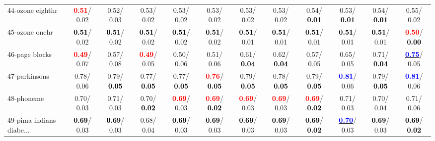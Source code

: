 \begin{table}[h]
\begin{center}
{\begin{tabular}{lc|c|c|c|c|c|c|c|c|c|c}
44-ozone eighthr & \textcolor{red}{\textbf{  0.51}}/  0.02 &   0.52/  0.03 &   0.53/  0.02 &   0.53/  0.02 &   0.53/  0.02 &   0.53/  0.02 &   0.53/  0.02 &   0.54/\textcolor{black}{\textbf{  0.01}} &   0.53/\textcolor{black}{\textbf{  0.01}} &   0.54/\textcolor{black}{\textbf{  0.01}} &   0.55/  0.02 \\
45-ozone onehr & \textcolor{black}{\textbf{  0.51}}/  0.02 & \textcolor{black}{\textbf{  0.51}}/  0.02 & \textcolor{black}{\textbf{  0.51}}/  0.02 & \textcolor{black}{\textbf{  0.51}}/  0.02 & \textcolor{black}{\textbf{  0.51}}/  0.02 & \textcolor{black}{\textbf{  0.51}}/  0.01 & \textcolor{black}{\textbf{  0.51}}/  0.01 & \textcolor{black}{\textbf{  0.51}}/  0.01 & \textcolor{black}{\textbf{  0.51}}/  0.01 & \textcolor{black}{\textbf{  0.51}}/  0.01 & \textcolor{red}{\textbf{  0.50}}/\textcolor{black}{\textbf{  0.00}} \\
46-page blocks & \textcolor{red}{\textbf{  0.49}}/  0.07 &   0.57/  0.08 & \textcolor{red}{\textbf{  0.49}}/  0.05 &   0.50/  0.06 &   0.51/  0.06 &   0.61/\textcolor{black}{\textbf{  0.04}} &   0.62/\textcolor{black}{\textbf{  0.04}} &   0.57/  0.05 &   0.65/  0.05 &   0.71/\textcolor{black}{\textbf{  0.04}} & \underline{\textcolor{blue}{\textbf{  0.75}}}/  0.05 \\ \hline
47-parkinsons &   0.78/  0.06 &   0.79/\textcolor{black}{\textbf{  0.05}} &   0.77/\textcolor{black}{\textbf{  0.05}} &   0.77/\textcolor{black}{\textbf{  0.05}} & \textcolor{red}{\textbf{  0.76}}/\textcolor{black}{\textbf{  0.05}} &   0.79/\textcolor{black}{\textbf{  0.05}} &   0.78/\textcolor{black}{\textbf{  0.05}} &   0.79/\textcolor{black}{\textbf{  0.05}} & \textcolor{blue}{\textbf{  0.81}}/  0.06 &   0.79/\textcolor{black}{\textbf{  0.05}} & \textcolor{blue}{\textbf{  0.81}}/  0.06 \\
48-phoneme &   0.70/  0.03 &   0.71/  0.03 &   0.70/\textcolor{black}{\textbf{  0.02}} & \textcolor{red}{\textbf{  0.69}}/  0.03 & \textcolor{red}{\textbf{  0.69}}/\textcolor{black}{\textbf{  0.02}} & \textcolor{red}{\textbf{  0.69}}/  0.03 & \textcolor{red}{\textbf{  0.69}}/  0.03 & \textcolor{red}{\textbf{  0.69}}/\textcolor{black}{\textbf{  0.02}} &   0.71/  0.03 &   0.70/  0.04 &   0.71/  0.06 \\
49-pima indians diabe... & \textcolor{black}{\textbf{  0.69}}/  0.03 & \textcolor{black}{\textbf{  0.69}}/  0.03 &   0.68/  0.04 & \textcolor{black}{\textbf{  0.69}}/  0.03 & \textcolor{black}{\textbf{  0.69}}/  0.03 & \textcolor{black}{\textbf{  0.69}}/  0.03 & \textcolor{black}{\textbf{  0.69}}/  0.03 & \textcolor{black}{\textbf{  0.69}}/\textcolor{black}{\textbf{  0.02}} & \underline{\textcolor{blue}{\textbf{  0.70}}}/  0.03 & \textcolor{black}{\textbf{  0.69}}/  0.03 & \textcolor{black}{\textbf{  0.69}}/\textcolor{black}{\textbf{  0.02}} \\

\end{tabular}}
\end{center}
\end{table}
